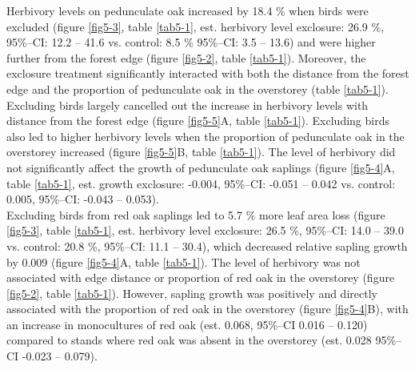 \documentclass[10pt, twoside]{book} %
\begin{document}
Herbivory levels on pedunculate oak increased by 18.4 \% when birds were excluded (figure \ref{fig5-3}, table \ref{tab5-1}, est. herbivory level exclosure: 26.9 \%, 95\%--CI: 12.2 -- 41.6 vs. control: 8.5 \% 95\%--CI: 3.5 -- 13.6) and were higher further from the forest edge (figure \ref{fig5-2}, table \ref{tab5-1}). Moreover, the exclosure treatment significantly interacted with both the distance from the forest edge and the proportion of pedunculate oak in the overstorey (table \ref{tab5-1}). Excluding birds largely cancelled out the increase in herbivory levels with distance from the forest edge (figure \ref{fig5-5}A, table \ref{tab5-1}). Excluding birds also led to higher herbivory levels when the proportion of pedunculate oak in the overstorey increased (figure \ref{fig5-5}B, table \ref{tab5-1}). The level of herbivory did not significantly affect the growth of pedunculate oak saplings (figure \ref{fig5-4}A, table \ref{tab5-1}, est. growth exclosure: -0.004, 95\%--CI: -0.051 -- 0.042 vs. control: 0.005, 95\%--CI: -0.043 -- 0.053).\\

Excluding birds from red oak saplings led to 5.7 \% more leaf area loss (figure \ref{fig5-3}, table \ref{tab5-1}, est. herbivory level exclosure: 26.5 \%, 95\%--CI: 14.0 -- 39.0 vs. control: 20.8 \%, 95\%--CI: 11.1 -- 30.4), which decreased relative sapling growth by 0.009 (figure \ref{fig5-4}A, table \ref{tab5-1}). The level of herbivory was not associated with edge distance or proportion of red oak in the overstorey (figure \ref{fig5-2}, table \ref{tab5-1}). However, sapling growth was positively and directly associated with the proportion of red oak in the overstorey (figure \ref{fig5-4}B), with an increase in monocultures of red oak (est. 0.068, 95\%--CI 0.016 -- 0.120) compared to stands where red oak was absent in the overstorey (est. 0.028 95\%--CI -0.023 -- 0.079).\\
\end{document}
